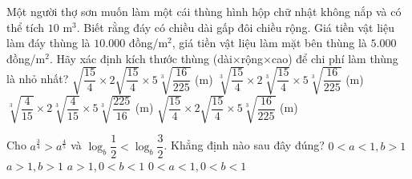 \begin{ex}%
	Một người thợ sơn muốn làm một cái thùng hình hộp chữ nhật không nắp và có thể tích $10$ m$^3$. Biết rằng đáy có chiều dài gấp đôi chiều rộng. Giá tiền vật liệu làm đáy thùng là $10.000$ đồng/m$^2$, giá tiền vật liệu làm mặt bên thùng là $5.000$ đồng/m$^2$. Hãy xác định kích thước thùng (dài$\times$rộng$\times$cao) để chi phí làm thùng là nhỏ nhất?
	\choice
	{$\sqrt{\dfrac{15}{4}}\times 2\sqrt{\dfrac{15}{4}} \times 5\sqrt[3]{\dfrac{16}{225}}$ (m)}
	{\True $\sqrt[3]{\dfrac{15}{4}}\times 2\sqrt[3]{\dfrac{15}{4}} \times 5\sqrt[3]{\dfrac{16}{225}}$ (m)}
	{$\sqrt[3]{\dfrac{4}{15}}\times 2\sqrt[3]{\dfrac{4}{15}} \times 5\sqrt[3]{\dfrac{225}{16}}$ (m)}
	{$\sqrt{\dfrac{15}{4}}\times 2\sqrt{\dfrac{15}{4}} \times 5\sqrt[3]{\dfrac{16}{225}}$ (m)}
\end{ex}

\begin{ex}%
	Cho $a^{\tfrac{3}{4}}>a^{\tfrac{4}{5}}$ và $\log_b\dfrac{1}{2}<\log_b\dfrac{3}{2}$. Khẳng định nào sau đây đúng?
	\choice
	{\True $0<a<1, b>1$}
	{$a>1, b>1$}
	{$a>1, 0<b<1$}
	{$0<a<1, 0<b<1$}
\end{ex}

